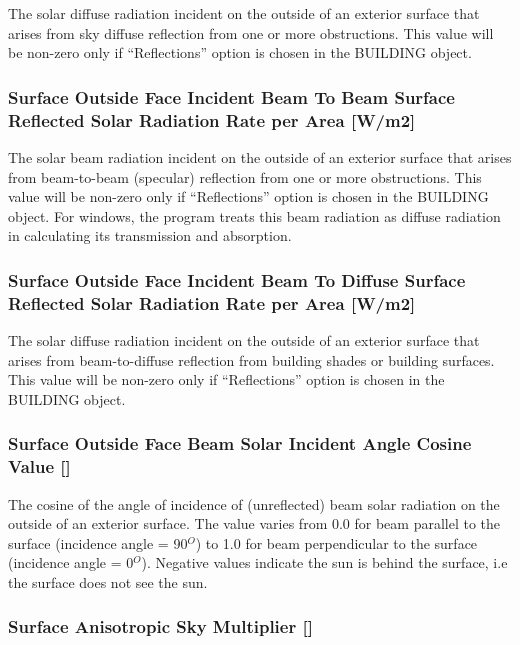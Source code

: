 The solar diffuse radiation incident on the outside of an exterior surface that arises from sky diffuse reflection from one or more obstructions. This value will be non-zero only if ``Reflections'' option is chosen in the BUILDING object.

\subsubsection{Surface Outside Face Incident Beam To Beam Surface Reflected Solar Radiation Rate per Area {[}W/m2{]}}\label{surface-outside-face-incident-beam-to-beam-surface-reflected-solar-radiation-rate-per-area-wm2}

The solar beam radiation incident on the outside of an exterior surface that arises from beam-to-beam (specular) reflection from one or more obstructions. This value will be non-zero only if ``Reflections'' option is chosen in the BUILDING object. For windows, the program treats this beam radiation as diffuse radiation in calculating its transmission and absorption.

\subsubsection{Surface Outside Face Incident Beam To Diffuse Surface Reflected Solar Radiation Rate per Area {[}W/m2{]}}\label{surface-outside-face-incident-beam-to-diffuse-surface-reflected-solar-radiation-rate-per-area-wm2}

The solar diffuse radiation incident on the outside of an exterior surface that arises from beam-to-diffuse reflection from building shades or building surfaces. This value will be non-zero only if ``Reflections'' option is chosen in the BUILDING object.

\subsubsection{Surface Outside Face Beam Solar Incident Angle Cosine Value {[]}}\label{surface-outside-face-beam-solar-incident-angle-cosine-value}

The cosine of the angle of incidence of (unreflected) beam solar radiation on the outside of an exterior surface. The value varies from 0.0 for beam parallel to the surface (incidence angle = 90\(^{O}\)) to 1.0 for beam perpendicular to the surface (incidence angle = 0\(^{O}\)). Negative values indicate the sun is behind the surface, i.e the surface does not see the sun.

\subsubsection{Surface Anisotropic Sky Multiplier {[]}}\label{surface-anisotropic-sky-multiplier}


